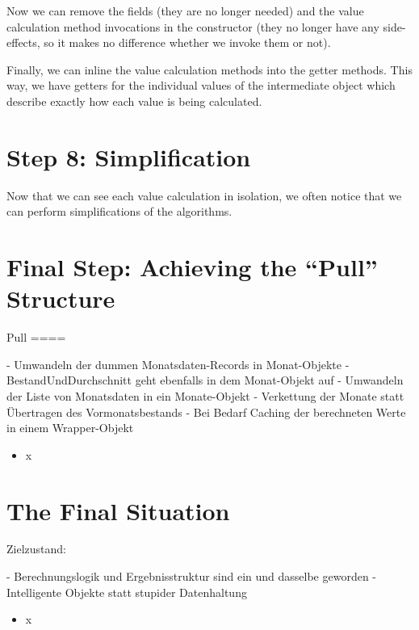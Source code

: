 \documentclass[a4paper,fleqn,titlepage,11pt]{article}
\begin{document}
Now we can remove the fields (they are no longer needed) and the value calculation method invocations in the constructor (they no longer have any side-effects, so it makes no difference whether we invoke them or not).

Finally, we can inline the value calculation methods into the getter methods. This way, we have getters for the individual values of the intermediate object which describe exactly how each value is being calculated.

\section{Step 8: Simplification}

Now that we can see each value calculation in isolation, we often notice that we can perform simplifications of the algorithms. 

\section{Final Step: Achieving the ``Pull'' Structure}



Pull
====

- Umwandeln der dummen Monatsdaten-Records in Monat-Objekte
- BestandUndDurchschnitt geht ebenfalls in dem Monat-Objekt auf
- Umwandeln der Liste von Monatsdaten in ein Monate-Objekt
- Verkettung der Monate statt Übertragen des Vormonatsbestands
- Bei Bedarf Caching der berechneten Werte in einem Wrapper-Objekt

\begin{itemize}
\item x
\end{itemize}

\section{The Final Situation}

Zielzustand:

- Berechnungslogik und Ergebnisstruktur sind ein und dasselbe geworden
- Intelligente Objekte statt stupider Datenhaltung

\begin{itemize}
\item x
\end{itemize}
\end{document}
